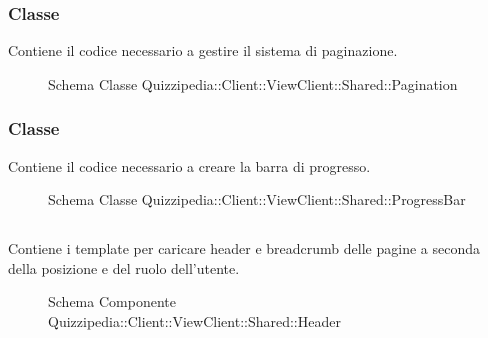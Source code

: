\subsubsection{Classe }
Contiene il codice necessario a gestire il sistema di paginazione.
\begin{figure}[H]
\centering
\noindent{}
\caption[Schema Classe Pagination]{Schema Classe Quizzipedia::Client::ViewClient::Shared::Pagination}
\end{figure}
\subsubsection{Classe }
Contiene il codice necessario a creare la barra di progresso.
\begin{figure}[H]
\centering
\noindent{}
\caption[Schema Classe ProgressBar]{Schema Classe Quizzipedia::Client::ViewClient::Shared::ProgressBar}
\end{figure}
\subsection{}
Contiene i template per caricare header e breadcrumb delle pagine a seconda della posizione e del ruolo dell'utente.
\begin{figure}[H]
\centering
\noindent{}
\caption[Schema Componente Quizzipedia::Client::ViewClient::Shared::Header]{Schema Componente Quizzipedia::Client::ViewClient::Shared::Header}
\end{figure}
